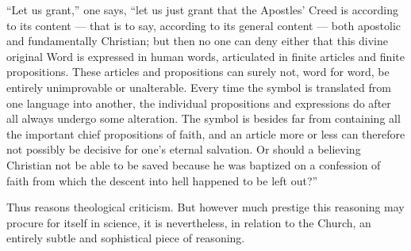 \documentclass[12pt,a4paper]{book}
\begin{document}
``Let us grant,'' one says, ``let us just grant that the Apostles' Creed is
according to its content --- that is to say, according to its general content
--- both apostolic and fundamentally Christian; but then no one can deny either
that this divine original Word is expressed in human words, articulated in
finite articles and
finite propositions. These articles and propositions can surely not, word for
word, be entirely unimprovable or unalterable. Every time the symbol is
translated from one language into another, the individual propositions and
expressions do after all always undergo some alteration. The symbol is besides
far from containing all the important chief propositions of faith, and an
article more or less can therefore not possibly be decisive for one's eternal
salvation. Or should a believing Christian not be able to be saved because he
was baptized on a confession of faith from which the descent into hell happened
to be left out?''

Thus reasons theological criticism. But however much prestige this reasoning may
procure for itself in science, it is nevertheless, in relation to the Church, an
entirely subtle and sophistical piece of reasoning.
\end{document}
